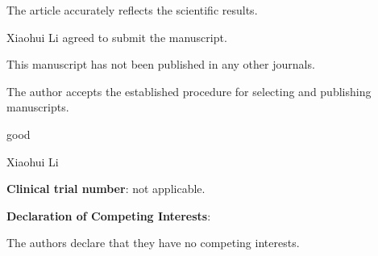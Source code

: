 \documentclass[11pt,a4paper]{article}
\begin{document}
The article accurately reflects the scientific results.

Xiaohui Li agreed to submit the manuscript.

This manuscript has not been published in any other journals.

The author accepts the established procedure for selecting and publishing manuscripts.

good

Xiaohui Li



 \textbf{\textbf{Clinical trial number}}: not applicable.
 
 \textbf{\textbf{Declaration of Competing Interests}}: 

The authors declare that they have no competing interests.
\end{document}
